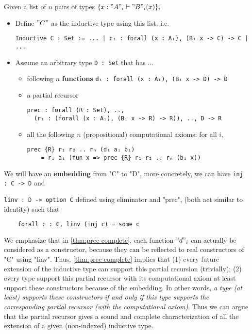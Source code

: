 \begin{theorem}\label{thm:prec-complete} Given a list of $n$ pairs of types $\{ x : "A"_i \vdash "B"_i(x) \}_{i}$
  \begin{itemize}
    \item Define $"C"$ as the inductive type using this list, i.e. 
    \begin{verbatim}
Inductive C : Set := ... | cᵢ : forall (x : Aᵢ), (Bᵢ x -> C) -> C | ...
    \end{verbatim}
    \item Assume an arbitrary type \texttt{D : Set} that has ...
    \begin{itemize}
      \item following $n$ \textbf{functions} \texttt{dᵢ : forall (x : Aᵢ), (Bᵢ x -> D) -> D}  
      \item a partial recursor 
      \begin{verbatim}
prec : forall (R : Set), ..,  
  (rᵢ : (forall (x : Aᵢ), (Bᵢ x -> R) -> R)), .., D -> R
      \end{verbatim}
      \item all the following $n$ (propositional) computational axioms: for all $i$, 
      \begin{verbatim}
prec {R} r₁ r₂ .. rₙ (dᵢ aᵢ bᵢ) 
    = rᵢ aᵢ (fun x => prec {R} r₁ r₂ .. rₙ (bᵢ x))
      \end{verbatim}
    \end{itemize}
  \end{itemize}
  We will have an \textbf{embedding} from "C" to "D", more concretely, we can have \texttt{inj : C -> D} and 

  \texttt{linv : D -> option C} defined using eliminator and "prec", (both act similar to identity) such that
  \begin{verbatim}
    forall c : C, linv (inj c) = some c
  \end{verbatim}
\end{theorem}

We emphasize that in \cref{thm:prec-complete}, each function $"d"_i$ can actually be considered as a constructor, because they can be reflected to real constructors of "C" using "linv". Thus, \cref{thm:prec-complete} implies that (1) every future extension of the inductive type can support this partial recursion (trivially); (2) every type support this partial recursor with its computational axiom at least support these constructors because of the embedding. In other words, \textit{a type (at least) supports these constructors if and only if this type supports the corresponding partial recursor (with the computational axiom)}.  Thus we can argue that the partial recursor gives a sound and complete characterization of all the extension of a given (non-indexed) inductive type.

